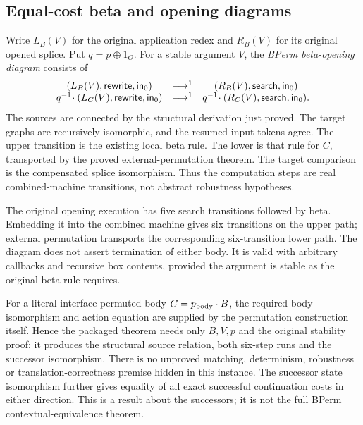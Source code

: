 \subsection{Equal-cost beta and opening diagrams}
Write $L_B(V)$ for the original application redex and $R_B(V)$ for its original
opened splice. Put $q=p\oplus1_O$. For a stable argument $V$, the
\emph{BPerm beta-opening diagram} consists of
\[
\begin{array}{ccc}
 (L_B(V),\mathsf{rewrite},\mathsf{in}_0)&\mathrel{\longrightarrow^{1}}&
 (R_B(V),\mathsf{search},\mathsf{in}_0)\\
 q^{-1}\!\cdot(L_C(V),\mathsf{rewrite},\mathsf{in}_0)&\mathrel{\longrightarrow^{1}}&
 q^{-1}\!\cdot(R_C(V),\mathsf{search},\mathsf{in}_0).
\end{array}
\]
The sources are connected by the structural derivation just proved. The
target graphs are recursively isomorphic, and the resumed input tokens agree.
The upper transition is the existing local beta rule. The lower is that rule
for $C$, transported by the proved external-permutation theorem. The target
comparison is the compensated splice isomorphism. Thus the computation steps
are real combined-machine transitions, not abstract robustness hypotheses.


The original opening execution has five search transitions followed by beta.
Embedding it into the combined machine gives six transitions on the upper
path; external permutation transports the corresponding six-transition lower
path. The diagram does not assert termination of either body. It is valid
with arbitrary callbacks and recursive box contents, provided the argument
is stable as the original beta rule requires.


For a literal interface-permuted body $C=p_{\rm body}\cdot B$, the required
body isomorphism and action equation are supplied by the permutation
construction itself. Hence the packaged theorem needs only $B,V,p$ and the
original stability proof: it produces the structural source relation, both
six-step runs and the successor isomorphism. There is no unproved matching,
determinism, robustness or translation-correctness premise hidden in this
instance. The successor state isomorphism further gives equality of all exact
successful continuation costs in either direction. This is a result about
the successors; it is not the full BPerm contextual-equivalence theorem.

